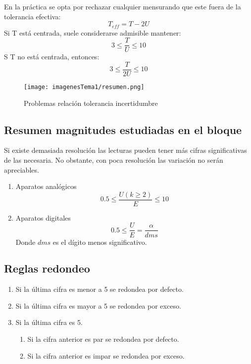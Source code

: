 En la práctica se opta por rechazar cualquier mensurando que este fuera de la tolerancia efectiva:
 \[T_{eff}=T-2U\]
 Si T está centrada, suele considerarse admisible mantener:
 \[3\leq \frac{T}{U} \leq 10\]
 S T no está centrada, entonces:
  \[3\leq \frac{T}{2U} \leq 10\]
 
 \begin{figure} [H]
 	\centering
 	\texttt{[image: imagenesTema1/resumen.png]}  
 	\caption{Problemas relación tolerancia incertidumbre}
 	\label{fig:sample}
 \end{figure}
 	
\subsection{Resumen magnitudes estudiadas en el bloque}
Si existe demasiada resolución las lecturas pueden tener más cifras significativas de las necesaria. No obstante, con poca resolución las variación no serán apreciables.
\begin{enumerate}
	\item Aparatos analógicos
	\[0.5\leq \frac{U(k \geq 2)}{E} \leq 10\]
	\item Aparatos digitales
		\[0.5\leq \frac{U}{E} = \frac{\alpha}{dms}\]
		Donde $dms$ es el dígito menos significativo.
\end{enumerate}
\subsection{Reglas redondeo}
\begin{enumerate}
	\item Si la última cifra es menor a 5 se redondea por defecto.

	\item Si la última cifra es mayor a 5 se redondea por exceso.
	
	
	\item Si la última cifra es 5.
	\begin{enumerate}
			\item Si la cifra anterior es par se redondea por defecto.
			\item Si la cifra anterior es impar se redondea por exceso.
	\end{enumerate}
\end{enumerate}
